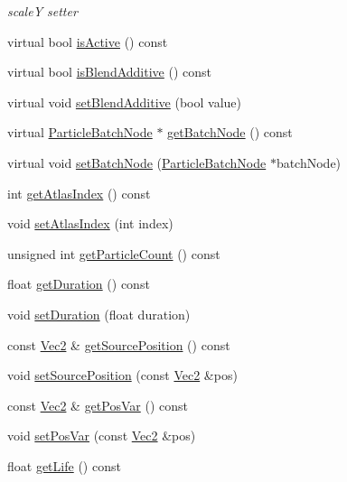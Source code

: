 \begin{DoxyCompactItemize}
\begin{DoxyCompactList}\small\item\em scaleY setter \end{DoxyCompactList}\item 
virtual bool \hyperlink{classParticleSystem_aa6c86db12678df30ce2868fac61bcaf2}{is\+Active} () const
\item 
virtual bool \hyperlink{classParticleSystem_ad6a2245364fcfa548699231e5cc93d3f}{is\+Blend\+Additive} () const
\item 
virtual void \hyperlink{classParticleSystem_a08affe076082421f74e427128de30509}{set\+Blend\+Additive} (bool value)
\item 
virtual \hyperlink{classParticleBatchNode}{Particle\+Batch\+Node} $\ast$ \hyperlink{classParticleSystem_aa24f9dd4a3a2f4cae38fd0ff86d7ac2e}{get\+Batch\+Node} () const
\item 
virtual void \hyperlink{classParticleSystem_a25d4f3b0af694369293e586cfde4d470}{set\+Batch\+Node} (\hyperlink{classParticleBatchNode}{Particle\+Batch\+Node} $\ast$batch\+Node)
\item 
int \hyperlink{classParticleSystem_a43c52380c9e8caaaf1440758a35eec72}{get\+Atlas\+Index} () const
\item 
void \hyperlink{classParticleSystem_ae6e384f788e8bcb76ae4082b0f329cee}{set\+Atlas\+Index} (int index)
\item 
unsigned int \hyperlink{classParticleSystem_a730a00168ae2f5df5fe41b0b6681609b}{get\+Particle\+Count} () const
\item 
float \hyperlink{classParticleSystem_a6d8eb072c8670ee64381e6dbdb691070}{get\+Duration} () const
\item 
void \hyperlink{classParticleSystem_ab19b5936cb1d031282c0b6019ae4c60d}{set\+Duration} (float duration)
\item 
const \hyperlink{classVec2}{Vec2} \& \hyperlink{classParticleSystem_a61545eb1a87b37e75981c5954b0a9546}{get\+Source\+Position} () const
\item 
void \hyperlink{classParticleSystem_a531acedca857579ae8228e2b4c38a978}{set\+Source\+Position} (const \hyperlink{classVec2}{Vec2} \&pos)
\item 
const \hyperlink{classVec2}{Vec2} \& \hyperlink{classParticleSystem_a8c2d579f46f0f6bb70a604503ad68fba}{get\+Pos\+Var} () const
\item 
void \hyperlink{classParticleSystem_aefe6eeaede73513fec84e21d1efbcb04}{set\+Pos\+Var} (const \hyperlink{classVec2}{Vec2} \&pos)
\item 
float \hyperlink{classParticleSystem_a81ac82a5e755de1d33cb3e3521a8f0bd}{get\+Life} () const

\end{DoxyCompactItemize}
